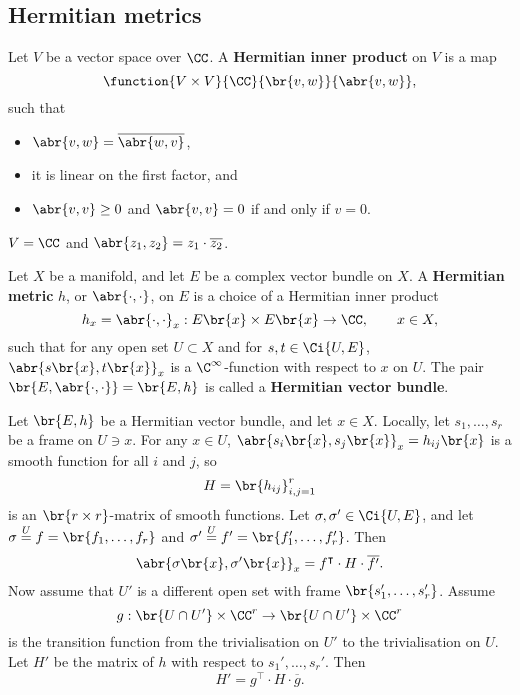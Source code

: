 \subsection{Hermitian metrics}

\begin{definition}
Let $ V $ be a vector space over $ \CC $. A \textbf{Hermitian inner product} on $ V $ is a map
$$ \function{V \times V}{\CC}{\br{v, w}}{\abr{v, w}}, $$
such that
\begin{itemize}
\item $ \abr{v, w} = \overline{\abr{w, v}} $,
\item it is linear on the first factor, and
\item $ \abr{v, v} \ge 0 $ and $ \abr{v, v} = 0 $ if and only if $ v = 0 $.
\end{itemize}
\end{definition}

\begin{example*}
$ V = \CC $ and $ \abr{z_1, z_2} = z_1 \cdot \overline{z_2} $.
\end{example*}

\pagebreak

\begin{definition}
Let $ X $ be a manifold, and let $ E $ be a complex vector bundle on $ X $. A \textbf{Hermitian metric} $ h $, or $ \abr{\cdot, \cdot} $, on $ E $ is a choice of a Hermitian inner product
$$ h_x = \abr{\cdot, \cdot}_x : E\br{x} \times E\br{x} \to \CC, \qquad x \in X, $$
such that for any open set $ U \subset X $ and for $ s, t \in \Ci{U, E} $, $ \abr{s\br{x}, t\br{x}}_x $ is a $ \C^\infty $-function with respect to $ x $ on $ U $. The pair $ \br{E, \abr{\cdot, \cdot}} = \br{E, h} $ is called a \textbf{Hermitian vector bundle}.
\end{definition}

Let $ \br{E, h} $ be a Hermitian vector bundle, and let $ x \in X $. Locally, let $ s_1, \dots, s_r $ be a frame on $ U \ni x $. For any $ x \in U $, $ \abr{s_i\br{x}, s_j\br{x}}_x = h_{ij}\br{x} $ is a smooth function for all $ i $ and $ j $, so
$$ H = \br{h_{ij}}_{i, j = 1}^r $$
is an $ \br{r \times r} $-matrix of smooth functions. Let $ \sigma, \sigma' \in \Ci{U, E} $, and let $ \sigma \overset{U}{=} f = \br{f_1, \dots, f_r} $ and $ \sigma' \overset{U}{=} f' = \br{f_1', \dots, f_r'} $. Then
$$ \abr{\sigma\br{x}, \sigma'\br{x}}_x = f^\intercal \cdot H \cdot \overline{f'}. $$
Now assume that $ U' $ is a different open set with frame $ \br{s_1', \dots, s_r'} $. Assume
$$ g : \br{U \cap U'} \times \CC^r \to \br{U \cap U'} \times \CC^r $$
is the transition function from the trivialisation on $ U' $ to the trivialisation on $ U $. Let $ H' $ be the matrix of $ h $ with respect to $ s_1', \dots, s_r' $. Then
$$ H' = g^\intercal \cdot H \cdot \overline{g}. $$


